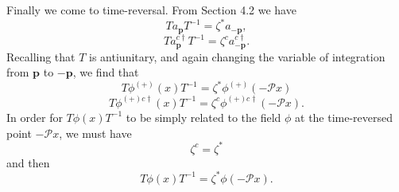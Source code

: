 Finally we come to time-reversal. From Section 4.2 we have
\begin{equation}
  T a_{\mathbf{p}}T^{-1}=\zeta^*a_{-\mathbf{p}},
  \tag{5.2.26}\label{eq:5.2.26}
\end{equation}
\begin{equation}
  T a^{c\dagger}_{\mathbf{p}}T^{-1}=\zeta^c a^{c\dagger}_{-\mathbf{p}}.
  \tag{5.2.27}\label{eq:5.2.27}
\end{equation}
Recalling that $T$ is antiunitary, and again changing the variable of
integration from $\mathbf{p}$ to $-\mathbf{p}$, we find that
\begin{equation}
  T\phi^{(+)}(x)T^{-1}=\zeta^*\phi^{(+)}(-\mathcal{P}x)
  \tag{5.2.28}\label{eq:5.2.28}
\end{equation}
\begin{equation}
  T\phi^{(+)c\dagger}(x)T^{-1}
  =\zeta^c\phi^{(+)c\dagger}(-\mathcal{P}x).
  \tag{5.2.29}\label{eq:5.2.29}
\end{equation}
In order for $T\phi(x)T^{-1}$ to be simply related to the field $\phi$ at the
time-reversed point $-\mathcal{P}x$, we must have
\begin{equation}
  \zeta^c=\zeta^*
  \tag{5.2.30}\label{eq:5.2.30}
\end{equation}
and then
\begin{equation}
  T\phi(x)T^{-1}=\zeta^*\phi(-\mathcal{P}x).
  \tag{5.2.31}\label{eq:5.2.31}
\end{equation}
